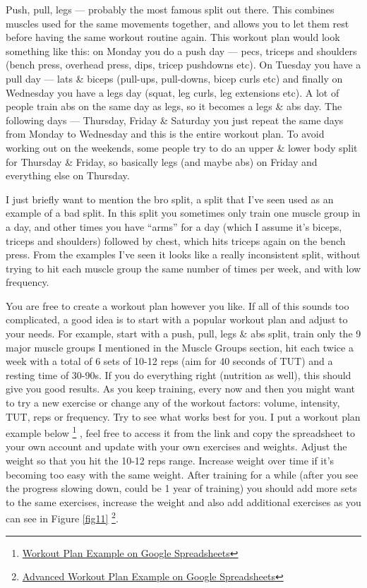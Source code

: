 \documentclass[openany, 12pt]{book}
\begin{document}
        Push, pull, legs --- probably the most famous split out there. This combines muscles used for the same movements together, and allows you to let them rest before having the same
        workout routine again. This workout plan would look something like this: on Monday you do a push day --- pecs, triceps and shoulders (bench press, overhead press, dips, tricep pushdowns etc).
        On Tuesday you have a pull day --- lats \& biceps (pull-ups, pull-downs, bicep curls etc) and finally on Wednesday you have a legs day (squat, leg curls, leg extensions etc). A lot of people
        train abs on the same day as legs, so it becomes a legs \& abs day. The following days --- Thursday, Friday \& Saturday you just repeat the same days from Monday to Wednesday and this is the
        entire workout plan. To avoid working out on the weekends, some people try to do an upper \& lower body split for Thursday \& Friday, so basically legs (and maybe abs) on Friday and everything
        else on Thursday. 

        I just briefly want to mention the bro split, a split that I've seen used as an example of a bad split. In this split you sometimes only train one muscle group in a day, and other times you
        have ``arms'' for a day (which I assume it's biceps, triceps and shoulders) followed by chest, which hits triceps again on the bench press. From the examples I've seen it looks like a really
        inconsistent split, without trying to hit each muscle group the same number of times per week, and with low frequency.
        
        You are free to create a workout plan however you like. If all of this sounds too complicated, a good idea is to start with a popular workout plan and adjust to your needs. For example, start
        with a push, pull, legs \& abs split, train only the 9 major muscle groups I mentioned in the Muscle Groups section, hit each twice a week with a total of 6 sets of 10-12 reps
        (aim for 40 seconds of TUT) and a resting time of 30-90s. If you do
        everything right (nutrition as well), this should give you good results. As you keep training, every now and then you might want to try a new exercise or change any of the workout factors:
        volume, intensity, TUT, reps or frequency. Try to see what works best for you.
        I put a workout plan example below
        \footnote{\href{https://docs.google.com/spreadsheets/d/10_J9RkAH8QSpqSg65c3OfkovorFkVoU3Bl213Y9xWUo/edit}{Workout Plan Example on Google Spreadsheets}}
        , feel
        free to access it from the link and copy the spreadsheet to your own account and update with your own exercises and weights. Adjust the weight so that you hit the 10-12 reps range.
        Increase weight over time if it's becoming too easy with the same weight. After training for a while (after you see the progress slowing down, could be 1 year of training)
        you should add more sets to the same exercises, increase the weight and also add additional exercises as you can see in Figure \ref{fig11}
        \footnote{\href{https://docs.google.com/spreadsheets/d/1A1-G2KrdD_O9NgyKty6OGyuEq619M2QIW6Ple3kbSSI/edit}{Advanced Workout Plan Example on Google Spreadsheets}}.
\end{document}
